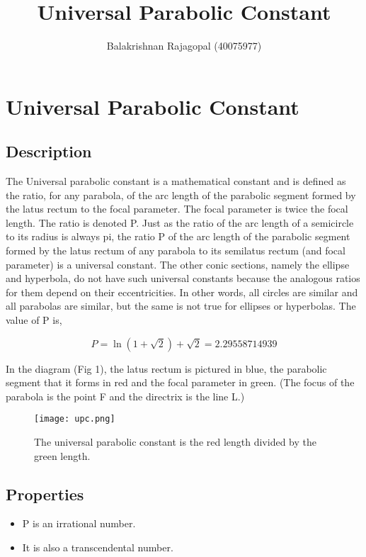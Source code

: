 \documentclass{report}
\title{Universal Parabolic Constant}
\author{Balakrishnan Rajagopal (40075977) }
\date{}
\begin{document}
\maketitle
\tableofcontents
\chapter{Universal Parabolic Constant}
\section{Description}
\onehalfspacing
The Universal parabolic constant is a mathematical constant and is defined as the ratio, for any parabola, of the arc length of the parabolic segment formed by the latus rectum to the focal parameter. The focal parameter is twice the focal length. The ratio is denoted P. Just as the ratio of the arc length of a semicircle to its radius is always pi, the ratio P of the arc length of the parabolic segment formed by the latus rectum of any parabola to its semilatus rectum (and focal parameter) is a universal constant. The other conic sections, namely the ellipse and hyperbola, do not have such universal constants because the analogous ratios for them depend on their eccentricities. In other words, all circles are similar and all parabolas are similar, but the same is not true for ellipses or hyperbolas.\newline
\newline The value of P is,

\begin{equation}
P = \ln(1+\sqrt{2})+\sqrt{2} = 2.29558714939
\end{equation}

\newline In the diagram (Fig 1), the latus rectum is pictured in blue, the parabolic segment that it forms in red
and the focal parameter in green. (The focus of the parabola is the point F and the directrix is the line L.)



\begin{figure}
\centering
    \texttt{[image: upc.png]}
    \caption{The universal parabolic constant is the red length divided by the green length.}
\end{figure}

\section{Properties}
\onehalfspacing
\newline
\begin{itemize}
  \item P is an irrational number.
  \item It is also a transcendental number.
\end{itemize}
\end{document}
